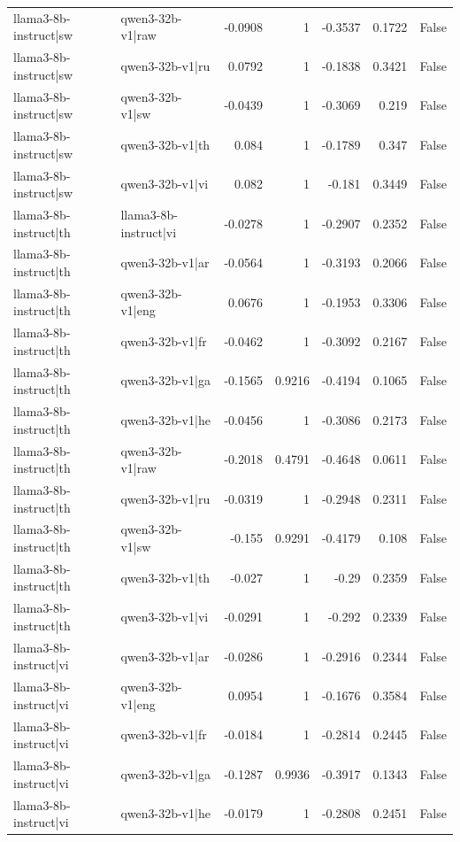 \begin{table}
\begin{tabular}{l l r r r r l}
llama3-8b-instruct|sw & qwen3-32b-v1|raw & -0.0908 & 1 & -0.3537 & 0.1722 & False \\
llama3-8b-instruct|sw & qwen3-32b-v1|ru & 0.0792 & 1 & -0.1838 & 0.3421 & False \\
llama3-8b-instruct|sw & qwen3-32b-v1|sw & -0.0439 & 1 & -0.3069 & 0.219 & False \\
llama3-8b-instruct|sw & qwen3-32b-v1|th & 0.084 & 1 & -0.1789 & 0.347 & False \\
llama3-8b-instruct|sw & qwen3-32b-v1|vi & 0.082 & 1 & -0.181 & 0.3449 & False \\
llama3-8b-instruct|th & llama3-8b-instruct|vi & -0.0278 & 1 & -0.2907 & 0.2352 & False \\
llama3-8b-instruct|th & qwen3-32b-v1|ar & -0.0564 & 1 & -0.3193 & 0.2066 & False \\
llama3-8b-instruct|th & qwen3-32b-v1|eng & 0.0676 & 1 & -0.1953 & 0.3306 & False \\
llama3-8b-instruct|th & qwen3-32b-v1|fr & -0.0462 & 1 & -0.3092 & 0.2167 & False \\
llama3-8b-instruct|th & qwen3-32b-v1|ga & -0.1565 & 0.9216 & -0.4194 & 0.1065 & False \\
llama3-8b-instruct|th & qwen3-32b-v1|he & -0.0456 & 1 & -0.3086 & 0.2173 & False \\
llama3-8b-instruct|th & qwen3-32b-v1|raw & -0.2018 & 0.4791 & -0.4648 & 0.0611 & False \\
llama3-8b-instruct|th & qwen3-32b-v1|ru & -0.0319 & 1 & -0.2948 & 0.2311 & False \\
llama3-8b-instruct|th & qwen3-32b-v1|sw & -0.155 & 0.9291 & -0.4179 & 0.108 & False \\
llama3-8b-instruct|th & qwen3-32b-v1|th & -0.027 & 1 & -0.29 & 0.2359 & False \\
llama3-8b-instruct|th & qwen3-32b-v1|vi & -0.0291 & 1 & -0.292 & 0.2339 & False \\
llama3-8b-instruct|vi & qwen3-32b-v1|ar & -0.0286 & 1 & -0.2916 & 0.2344 & False \\
llama3-8b-instruct|vi & qwen3-32b-v1|eng & 0.0954 & 1 & -0.1676 & 0.3584 & False \\
llama3-8b-instruct|vi & qwen3-32b-v1|fr & -0.0184 & 1 & -0.2814 & 0.2445 & False \\
llama3-8b-instruct|vi & qwen3-32b-v1|ga & -0.1287 & 0.9936 & -0.3917 & 0.1343 & False \\
llama3-8b-instruct|vi & qwen3-32b-v1|he & -0.0179 & 1 & -0.2808 & 0.2451 & False \\

\end{tabular}
\end{table}
